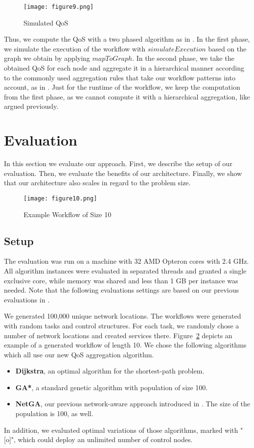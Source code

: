 \documentclass[10pt, conference, compsocconf]{IEEEtran}
\newcommand{\oneImage}{3.2in}
\newcommand{\oneHalfImages}{2.12in}
\begin{document}
\begin{figure}[htb!]
	\centering
  \texttt{[image: figure9.png]}
	\caption{Simulated QoS}
	\label{fig:workflow_qos_times}
\end{figure}

\noindent Thus, we compute the QoS with a two phased algorithm as in \cite{Klein2012}.
In the first phase, we simulate the execution of the workflow with $simulateExecution$
	based on the graph we obtain by applying $mapToGraph$.
In the second phase, we take the obtained QoS for each node and aggregate it in a hierarchical manner
	according to the commonly used aggregation rules that take our workflow patterns into account, as in \cite{Jaeger2004,Yu2007}.
Just for the runtime of the workflow, we keep the computation from the first phase,
	as we cannot compute it with a hierarchical aggregation, like argued previously.

\section{Evaluation}
\label{evaluation}
\noindent In this section we evaluate our approach.
First, we describe the setup of our evaluation.
Then,	we evaluate the benefits of our architecture.
Finally, we show that our architecture also scales in regard to the problem size.

\begin{figure}[b]
	\centering
	\texttt{[image: figure10.png]}
	\caption{Example Workflow of Size 10}
	\label{fig:generated_workflows}
\end{figure}

\subsection{Setup}
\noindent The evaluation was run on a machine with 32 AMD Opteron cores with 2.4 GHz.
All algorithm instances were evaluated in separated threads and granted a single exclusive core,
	while memory was shared and less than 1 GB per instance was needed.
Note that the following evaluations settings are based on our previous evaluations in \cite{Klein2012}.
	
We generated 100,000 unique network locations.
The workflows were generated with random tasks and control structures.
For each task, we randomly chose a number of network locations and created services there.
Figure~\ref{fig:generated_workflows} depicts an example of a generated workflow of length 10.
We chose the following algorithms which all use our new QoS aggregation algorithm.
\begin{itemize}
	\item \textbf{Dijkstra}, an optimal algorithm for the shortest-path problem.
	\item \textbf{GA*}, a standard genetic algorithm with population of size 100.
	\item \textbf{NetGA}, our previous network-aware approach introduced in \cite{Klein2012}. The size of the population is 100, as well. 
\end{itemize}
In addition, we evaluated optimal variations of those algorithms, marked with "[o]",
	which could deploy an unlimited number of control nodes.
\end{document}
